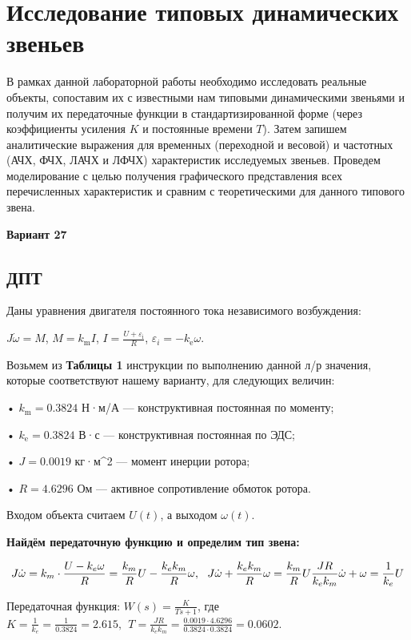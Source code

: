 
\section{Исследование типовых динамических звеньев}

В рамках данной лабораторной работы необходимо исследовать реальные объекты, сопоставим их с известными нам типовыми динамическими звеньями и получим их передаточные функции в стандартизированной форме (через коэффициенты усиления $K$ и постоянные времени $T$). Затем запишем аналитические выражения для временных (переходной и весовой) и частотных (АЧХ, ФЧХ, ЛАЧХ и ЛФЧХ) характеристик исследуемых звеньев. Проведем моделирование с целью получения графического представления всех перечисленных характеристик и сравним с теоретическими для данного типового звена.

\textbf{Вариант 27}

\subsection{ДПТ}

Даны уравнения двигателя постоянного тока независимого возбуждения:

$J\dot{\omega} =M$, $M=k_{\text{m}} I$, $I=\frac{U+\varepsilon_{\text{i}} }{R}$, $\varepsilon_i =-k_{\text{e}} \omega$.

Возьмем из \textbf{Таблицы 1} инструкции по выполнению данной л/р значения, которые соответствуют нашему варианту, для следующих величин:

• $k_{\text{m}} =0.3824$ Н·м/А — конструктивная постоянная по моменту;

• $k_{\text{e}} =0.3824$ В·с — конструктивная постоянная по ЭДС;

• $J=0.0019$ кг·м\textasciicircum{}2 — момент инерции ротора;

• $R=4.6296$ Ом — активное сопротивление обмоток ротора.

Входом объекта считаем $U(t)$, а выходом $\omega (t)$.

\textbf{Найдём передаточную функцию и определим тип звена:}

$$
J\dot{\omega} =k_m \cdot \frac{U-k_e \omega }{R}=\frac{k_m }{R}U-\frac{k_e k_m }{R}\omega ,~~J\dot{\omega} +\frac{k_e k_m }{R}\omega =\frac{k_m }{R}U\\
\frac{JR}{k_e k_m }\dot{\omega} +\omega =\frac{1}{k_e }U
$$

Передаточная функция: $W(s)=\frac{K}{Ts+1}$, где $K=\frac{1}{k_e }=\frac{1}{0.3824}=2.615,~~T=\frac{JR}{k_e k_m }=\frac{0.0019\cdot 4.6296}{0.3824\cdot 0.3824}=0.0602$.

